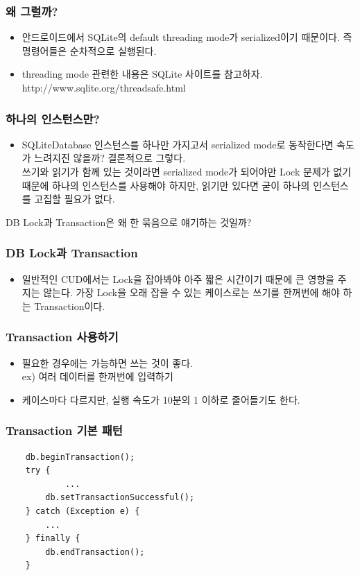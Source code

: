 \documentclass{beamer}
\begin{document}
\begin{frame}
\frametitle{왜 그럴까?}
\begin{itemize}
\item 안드로이드에서 SQLite의 default threading mode가 serialized이기 때문이다. 즉 명령어들은 순차적으로 실행된다.
\item threading mode 관련한 내용은 SQLite 사이트를 참고하자. http://www.sqlite.org/threadsafe.html
\end{itemize}
\end{frame}

\begin{frame}
\frametitle{하나의 인스턴스만?}
\begin{itemize}
\item SQLiteDatabase 인스턴스를 하나만 가지고서 serialized mode로 동작한다면 속도가 느려지진 않을까? 결론적으로 그렇다.\\
쓰기와 읽기가 함께 있는 것이라면 serialized mode가 되어야만 Lock 문제가 없기 때문에 하나의 인스턴스를 사용해야 하지만, 읽기만 있다면 굳이 하나의 인스턴스를 고집할 필요가 없다.
\end{itemize}
\end{frame}

\begin{frame}
DB Lock과 Transaction은 왜 한 묶음으로 얘기하는 것일까?
\end{frame}

\begin{frame}
\frametitle{DB Lock과 Transaction}
\begin{itemize}
\item 일반적인 CUD에서는 Lock을 잡아봐야 아주 짧은 시간이기 때문에 큰 영향을 주지는 않는다. 가장 Lock을 오래 잡을 수 있는 케이스로는 쓰기를 한꺼번에 해야 하는 Transaction이다.
\end{itemize}
\end{frame}

\begin{frame}
\frametitle{Transaction 사용하기}
\begin{itemize}
\item 필요한 경우에는 가능하면 쓰는 것이 좋다. \\
ex) 여러 데이터를 한꺼번에 입력하기
\item 케이스마다 다르지만, 실행 속도가 10분의 1 이하로 줄어들기도 한다.
\end{itemize}
\end{frame}

\begin{frame}[fragile]
\frametitle{Transaction 기본 패턴}
\begin{verbatim}
	db.beginTransaction();
	try {
	    	...
	    db.setTransactionSuccessful();
	} catch (Exception e) {
	    ...
	} finally {
	    db.endTransaction();
	}
\end{verbatim}
\end{frame}
\end{document}
